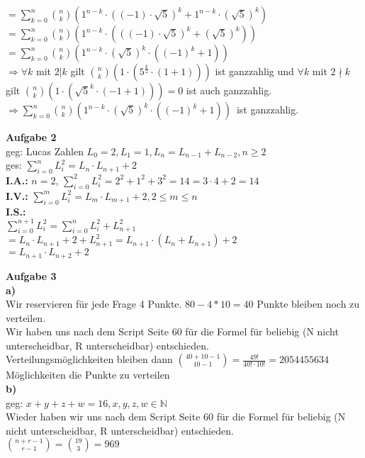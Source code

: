 \documentclass[a4paper]{scrartcl}
\begin{document}
\begin{flushleft}
		$= \sum\limits_{k=0}^{n}\binom{n}{k}(1^{n-k}\cdot ((-1)\cdot \sqrt{5})^k + 1^{n-k}\cdot (\sqrt{5})^k)$\\
		$= \sum\limits_{k=0}^{n}\binom{n}{k}(1^{n-k}\cdot (((-1)\cdot \sqrt{5})^k + (\sqrt{5})^k))$\\
		$= \sum\limits_{k=0}^{n}\binom{n}{k}(1^{n-k}\cdot (\sqrt{5})^k \cdot((-1)^k  + 1))$\\
		$\Rightarrow \forall k $ mit $2|k$ gilt $\binom{n}{k}(1\cdot (5^{\frac{k}{2}} \cdot(1  + 1)))$ ist ganzzahlig und $\forall k $ mit $2\nmid k$ gilt $\binom{n}{k}(1\cdot (\sqrt{5}^k \cdot(-1  + 1))) = 0$ ist auch ganzzahlig.\\
		$\Rightarrow \sum\limits_{k=0}^{n}\binom{n}{k}(1^{n-k}\cdot (\sqrt{5})^k \cdot((-1)^k  + 1))$\ ist ganzzahlig.\\
	\end{flushleft}
	\begin{flushleft}
		\textbf{Aufgabe 2}\\
		geg: Lucas Zahlen $L_0=2,L_1=1,L_n=L_{n-1}+L_{n-2}, n\ge 2$\\
		ges: $\sum\limits_{i=0}^{n}L_i^2=L_n\cdot L_{n+1}+2$\\[1em]
		\textbf{I.A.:} $n=2$, $\sum\limits_{i=0}^{2}L_i^2=2^2+1^2+3^2=14=3\cdot 4+2 = 14$\\ [1em]
		\textbf{I.V.:} $\sum\limits_{i=0}^{m}L_i^2=L_m\cdot L_{m+1}+2, 2\le m \le n$\\[1em]
		\textbf{I.S.:} \\
		$\sum\limits_{i=0}^{n+1}L_i^2 = \sum\limits_{i=0}^{n}L_i^2 + L_{n+1}^2$\\
		$= L_n\cdot L_{n+1}+2 + L_{n+1}^2 = L_{n+1}\cdot(L_n+L_{n+1}) + 2$\\
		$= L_{n+1}\cdot L_{n+2} + 2$\\[1em]
	\end{flushleft}
	\begin{flushleft}
		\textbf{Aufgabe 3}\\
		\textbf{a)}\\
		Wir reservieren für jede Frage 4 Punkte. $80-4*10=40$ Punkte bleiben noch zu verteilen.\\
		Wir haben uns nach dem Script Seite 60 für die Formel für beliebig (N nicht unterscheidbar, R unterscheidbar) entschieden.\\
		Verteilungsmöglichkeiten bleiben dann $\binom{40+10-1}{10-1} = \frac{49!}{40!\cdot 10!}=2054455634$ Möglichkeiten die Punkte zu verteilen\\[1em]
		\textbf{b)} \\
		geg: $x+y+z+w=16, x,y,z,w\in \mathbb{N}$\\
		Wieder haben wir uns nach dem Script Seite 60 für die Formel für beliebig (N nicht unterscheidbar, R unterscheidbar) entschieden.\\
		$\binom{n+r-1}{r-1} = \binom{19}{3}=969$\\[1em]		
	\end{flushleft}
\end{document}
